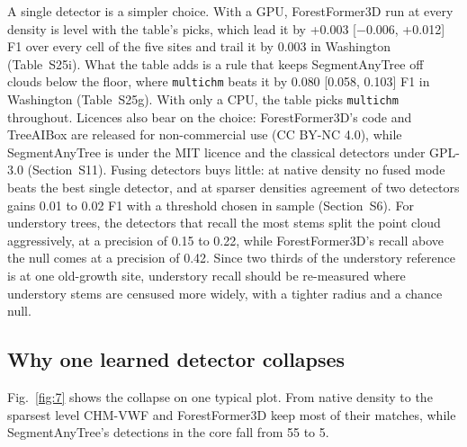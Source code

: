 \documentclass[preprint,12pt,authoryear,a4paper]{elsarticle}
\begin{document}
A single detector is a simpler choice. With a GPU, ForestFormer3D run at every
density is level with the table's picks, which lead it by +0.003 [$-$0.006,
+0.012] F1 over every cell of the five sites and trail it by 0.003 in Washington
(Table~S25i). What the table adds is a rule that keeps SegmentAnyTree off clouds
below the floor, where \texttt{multichm} beats it by 0.080 [0.058, 0.103] F1 in
Washington (Table~S25g). With only a CPU, the table picks \texttt{multichm}
throughout. Licences also bear on the choice: ForestFormer3D's
code and TreeAIBox are released for non-commercial use (CC BY-NC 4.0), while
SegmentAnyTree is under the MIT licence and the classical detectors under
GPL-3.0 (Section~S11). Fusing detectors buys little: at native density no
fused mode beats the best single detector, and at sparser densities agreement of
two detectors gains 0.01 to 0.02 F1 with a threshold chosen in sample (Section~S6). For understory trees, the detectors that recall the most stems split the
point cloud aggressively, at a precision of 0.15 to 0.22, while ForestFormer3D's
recall above the null comes at a precision of 0.42. Since two thirds of the
understory reference is at one old-growth site, understory recall should be
re-measured where understory stems are censused more widely, with a tighter
radius and a chance null.

\subsection{Why one learned detector collapses}\label{sec:6.2}

Fig.~\ref{fig:7} shows the collapse on one typical plot. From native density to the
sparsest level CHM-VWF and ForestFormer3D keep most of their matches, while
SegmentAnyTree's detections in the core fall from 55 to 5.
\end{document}
